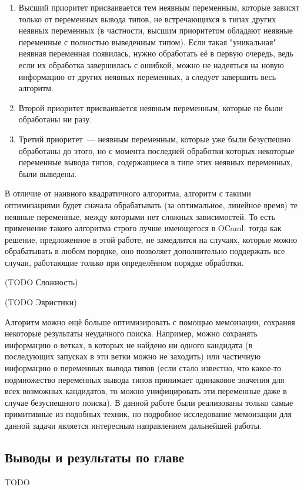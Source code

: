 \documentclass[../diploma.tex]{subfiles}
\begin{document}
\begin{enumerate}
\item Высший приоритет присваивается тем неявным переменным, которые зависят только от переменных вывода типов, не встречающихся в типах других неявных переменных (в частности, высшим приоритетом обладают неявные переменные с полностью выведенным типом). Если такая "уникальная" неявная переменная появилась, нужно обработать её в первую очередь, ведь если их обработка завершилась с ошибкой, можно не надеяться на новую информацию от других неявных переменных, а следует завершить весь алгоритм.

\item Второй приоритет присваивается неявным переменным, которые не были обработаны ни разу.

\item Третий приоритет~--- неявным переменным, которые уже были безуспешно обработаны до этого, но с момента последней обработки которых некоторые переменные вывода типов, содержащиеся в типе этих неявных переменных, были выведены.
\end{enumerate}

В отличие от наивного квадратичного алгоритма, алгоритм с такими оптимизациями будет сначала обрабатывать (за оптимальное, линейное время) те неявные переменные, между которыми нет сложных зависимостей. То есть применение такого алгоритма строго лучше имеющегося в OCaml: тогда как решение, предложенное в этой работе, не замедлится на случаях, которые можно обрабатывать в любом порядке, оно позволяет дополнительно поддержать все случаи, работающие только при определённом порядке обработки.

(TODO Сложность) 

(TODO Эвристики)

Алгоритм можно ещё больше оптимизировать с помощью мемоизации, сохраняя некоторые результаты неудачного поиска. Например, можно сохранять информацию о ветках, в которых не найдено ни одного кандидата (в последующих запусках в эти ветки можно не заходить) или частичную информацию о переменных вывода типов (если стало известно, что какое-то подмножество переменных вывода типов принимает одинаковое значения для всех возможных кандидатов, то можно унифицировать эти переменные даже в случае безуспешного поиска). В данной работе были реализованы только самые примитивные из подобных техник, но подробное исследование мемоизации для данной задачи является интересным направлением дальнейшей работы.

\subsection{Выводы и результаты по главе}

TODO
\end{document}
